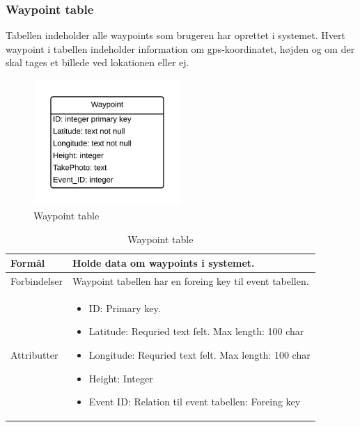 \subsubsection*{Waypoint table}
Tabellen indeholder alle waypoints som brugeren har oprettet i systemet. Hvert waypoint i tabellen indeholder information om gps-koordinatet, højden og om der skal tages et billede ved lokationen eller ej.
\vspace{-5pt}
\begin{figure}[H]
	\centering
	\includegraphics[width=0.5\textwidth]{Billeder/database/WaypointTable.png}
	\vspace{-5pt}
	\caption{Waypoint table}
	\label{fig:waypoint_table}
\end{figure}

\begin{table}[H]
\begin{tabular}{| p{3cm}| p{11.5cm}|}
\hline

Formål	 							& Holde data om waypoints i systemet.\\\hline
Forbindelser						& Waypoint tabellen har en foreing key til event tabellen.\\\hline
Attributter						& \begin{itemize}
												\item ID: Primary key.
												\item Latitude: Requried text felt. Max length: 100 char
												\item Longitude: Requried text felt. Max length: 100 char
												\item Height: Integer
												\item Event ID: Relation til event tabellen: Foreing key
											\end{itemize} \\\hline 
\end{tabular}
\caption{Waypoint table}
\label{tab:waypoint_table}
\end{table}